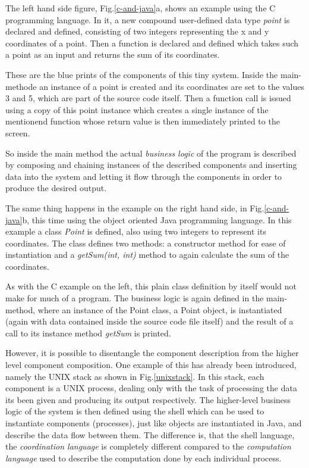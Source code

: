 The left hand side figure, Fig.\ref{c-and-java}a, shows an example
using the C programming language. In it, a new compound user-defined
data type \textit{point} is declared and defined, consisting of two
integers representing the x and y coordinates of a point.
Then a function is declared and defined which takes such a point
as an input and returns the sum of its coordinates.

These are the blue prints of the components of this tiny system.
Inside the main-methode an instance of a point is created and
its coordinates are set to the values 3 and 5, which are part of
the source code itself. Then a function call is issued using a copy of
this point instance which creates a single instance of the mentionend
function whose return value is then immediately printed to the screen.

So inside the main method the actual \textit{business logic} of
the program is described by composing and chaining instances of the
described components and inserting data into the system and letting
it flow through the components in order to produce the desired output.
\newline

The same thing happens in the example on the right hand side, in
Fig.\ref{c-and-java}b, this time using the object oriented Java
programming language. In this example a class \textit{Point} is
defined, also using two integers to represent its coordinates.
The class defines two methods: a constructor method for ease of
instantiation and a \textit{getSum(int, int)} method to again
calculate the sum of the coordinates.

As with the C example on the left, this plain class definition
by itself would not make for much of a program. The business logic
is again defined in the main-method, where an instance of the Point
class, a Point object, is instantiated (again with data contained
inside the source code file itself) and the result of a call to
its instance method \textit{getSum} is printed.
\newline

However, it is possible to disentangle the component description
from the higher level component composition. One example of this
has already been introduced, namely the UNIX stack as shown in
Fig.\ref{unixstack}. In this stack, each component is a UNIX
process, dealing only with the task of processing the data its
been given and producing its output respectively. The higher-level
business logic of the system is then defined using the shell
which can be used to instantiate components (processes),
just like objects are instantiated in Java, and describe the data
flow between them. The difference is, that the shell language, the
\textit{coordination language} is completely
different compared to the \textit{computation language} used to
describe the computation done by each individual process.


